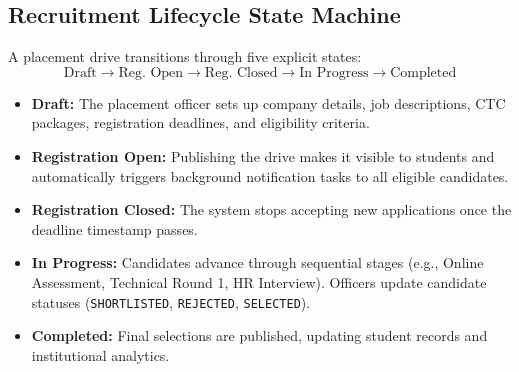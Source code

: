 \documentclass[conference]{IEEEtran}
\begin{document}
\subsection{Recruitment Lifecycle State Machine}
A placement drive transitions through five explicit states:
\begin{equation}
\text{Draft} \longrightarrow \text{Reg. Open} \longrightarrow \text{Reg. Closed} \longrightarrow \text{In Progress} \longrightarrow \text{Completed}
\end{equation}
\begin{itemize}
    \item \textbf{Draft:} The placement officer sets up company details, job descriptions, CTC packages, registration deadlines, and eligibility criteria.
    \item \textbf{Registration Open:} Publishing the drive makes it visible to students and automatically triggers background notification tasks to all eligible candidates.
    \item \textbf{Registration Closed:} The system stops accepting new applications once the deadline timestamp passes.
    \item \textbf{In Progress:} Candidates advance through sequential stages (e.g., Online Assessment, Technical Round 1, HR Interview). Officers update candidate statuses (\texttt{SHORTLISTED}, \texttt{REJECTED}, \texttt{SELECTED}).
    \item \textbf{Completed:} Final selections are published, updating student records and institutional analytics.
\end{itemize}
\end{document}
